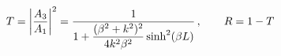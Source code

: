 \documentclass[preview]{standalone}
\begin{document}
\begin{align*}
\special{dvisvgm:raw <g id='unique000'>}T=\left|\frac{A_3}{A_1}\right|^2=\frac{1}{1+\dfrac{(\beta^2+k^2)^2}{4k^2\beta^2}\sinh^2(\beta L)}\,,\qquad R=1-T\special{dvisvgm:raw </g>}
\end{align*}
\end{document}

